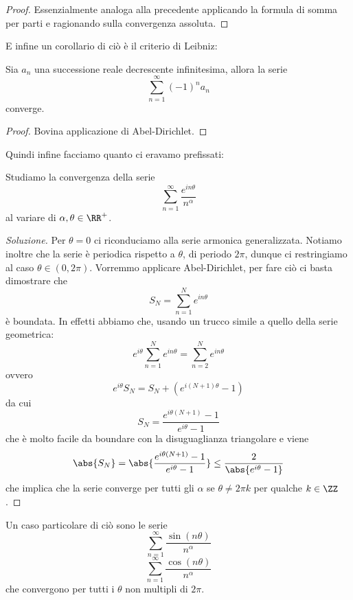 \documentclass[11pt]{scrartcl}
\begin{document}
	\begin{proof}
		Essenzialmente analoga alla precedente applicando la formula di somma per parti e ragionando sulla convergenza assoluta.
	\end{proof}
	E infine un corollario di ciò è il criterio di Leibniz:
	\begin{corollary}
		Sia $a_n$ una successione reale decrescente infinitesima, allora la serie
		$$\sum_{n=1}^{\infty}\left(-1\right)^na_n$$
		converge.
	\end{corollary}
	\begin{proof}
		Bovina applicazione di Abel-Dirichlet.
	\end{proof}
	Quindi infine facciamo quanto ci eravamo prefissati:
	\begin{example}
		Studiamo la convergenza della serie
		$$\sum_{n=1}^{\infty}\frac{e^{in\theta}}{n^\alpha}$$
		al variare di $\alpha,\theta\in\RR^+$.
	\end{example}
	\begin{proof}[Soluzione]
		Per $\theta=0$ ci riconduciamo alla serie armonica generalizzata. Notiamo inoltre che la serie è periodica rispetto a $\theta$, di periodo $2\pi$, dunque ci restringiamo al caso $\theta\in(0,2\pi)$. Vorremmo applicare Abel-Dirichlet, per fare ciò ci basta dimostrare che
		$$S_N=\sum_{n=1}^{N}e^{in\theta}$$
		è boundata. In effetti abbiamo che, usando un trucco simile a quello della serie geometrica:
		$$e^{i\theta}\sum_{n=1}^{N}e^{in\theta}=\sum_{n=2}^{N}e^{in\theta}$$
		ovvero
		$$e^{i\theta}S_N=S_N+\left(e^{i(N+1)\theta}-1\right)$$
		da cui
		$$S_N=\frac{e^{i\theta(N+1)}-1}{e^{i\theta}-1}$$
		che è molto facile da boundare con la disuguaglianza triangolare e viene
		$$\abs{S_N}=\abs{\frac{e^{i\theta(N+1)}-1}{e^{i\theta}-1}}\le \frac{2}{\abs{e^{i\theta}-1}}$$
		che implica che la serie converge per tutti gli $\alpha$ se $\theta\ne 2\pi k$ per qualche $k\in\ZZ$.
	\end{proof}
	Un caso particolare di ciò sono le serie
	$$\sum_{n=1}^{\infty}\frac{\sin(n\theta)}{n^\alpha}$$
	$$\sum_{n=1}^{\infty}\frac{\cos(n\theta)}{n^\alpha}$$
	che convergono per tutti i $\theta$ non multipli di $2\pi$.
\end{document}
